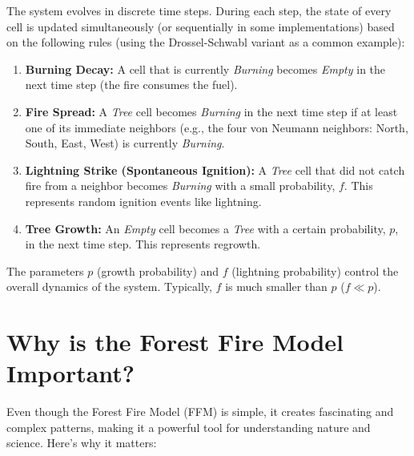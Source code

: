\documentclass{article}
\begin{document}
The system evolves in discrete time steps. During each step, the state of every cell is updated simultaneously (or sequentially in some implementations) based on the following rules (using the Drossel-Schwabl variant as a common example):

\begin{enumerate}
    \item \textbf{Burning Decay:} A cell that is currently \emph{Burning} becomes \emph{Empty} in the next time step (the fire consumes the fuel).
    \item \textbf{Fire Spread:} A \emph{Tree} cell becomes \emph{Burning} in the next time step if at least one of its immediate neighbors (e.g., the four von Neumann neighbors: North, South, East, West) is currently \emph{Burning}.
    \item \textbf{Lightning Strike (Spontaneous Ignition):} A \emph{Tree} cell that did not catch fire from a neighbor becomes \emph{Burning} with a small probability, $f$. This represents random ignition events like lightning.
    \item \textbf{Tree Growth:} An \emph{Empty} cell becomes a \emph{Tree} with a certain probability, $p$, in the next time step. This represents regrowth.
\end{enumerate}

The parameters $p$ (growth probability) and $f$ (lightning probability) control the overall dynamics of the system. Typically, $f$ is much smaller than $p$ ($f \ll p$).


\section{Why is the Forest Fire Model Important?}

Even though the Forest Fire Model (FFM) is simple, it creates fascinating and complex patterns, making it a powerful tool for understanding nature and science. Here’s why it matters:
\end{document}
